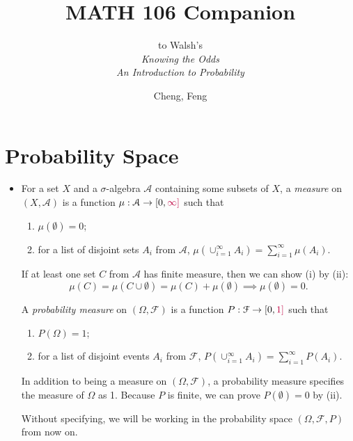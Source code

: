 \documentclass[11pt]{article}
\title{MATH 106 Companion}
\author{Cheng, Feng}
\subtitle{to Walsh's \\ \textit{Knowing the Odds \\ An Introduction to Probability}}
\date{}
\newcommand{\df}[1]{\textit{\textsf{#1}}} %
\newcommand{\F}{\mathcal{F}} %
\newcommand{\A}{\mathcal{A}}
\newcommand{\tpurp}[1]{\textcolor{purple}{#1}}
\begin{document}
\maketitle

\section{Probability Space}
\begin{itemize}
    \item For a set $X$ and a $\sigma$-algebra $\A$ containing some subsets of $X$, a \df{measure} on $(X,\A)$ is a function $\mu: \A \to [0, \tpurp{\infty]}$ such that 
    \begin{enumerate}[label=(\roman*)]
        \item $\mu(\emptyset)=0$;
        \item for a list of disjoint sets $A_i$ from $\A$, $\mu(\cup_{i=1}^\infty A_i) = \sum_{i=1}^\infty \mu(A_i)$.
    \end{enumerate}
    If at least one set $C$ from $\A$ has finite measure, then we can show (i) by (ii): \[\mu(C) = \mu(C \cup \emptyset) = \mu(C) + \mu(\emptyset) \implies \mu(\emptyset) = 0.\]
    
    A \df{probability measure} on $(\Omega, \F)$ is a function $P: \F \to [0,\tpurp{1]}$ such that 
    \begin{enumerate}[label=(\roman*)]
        \item $P(\Omega) = 1$;
        \item for a list of disjoint events $A_i$ from $\F$, $P(\cup_{i=1}^\infty A_i) = \sum_{i=1}^\infty P(A_i)$.
    \end{enumerate}
    In addition to being a measure on $(\Omega, \F)$, a probability measure specifies the measure of $\Omega$ as 1. Because $P$ is finite, we can prove $P(\emptyset) = 0$ by (ii).
    
    Without specifying, we will be working in the probability space $(\Omega, \F, P)$ from now on.
\end{itemize}
\end{document}
